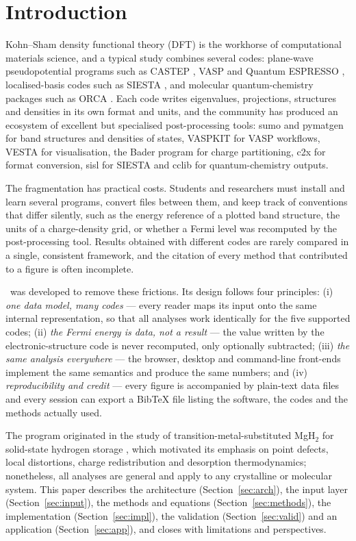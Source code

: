 \section{Introduction}
Kohn–Sham density functional theory (DFT) \cite{hohenberg1964,kohn1965} is the workhorse of computational materials science, and a typical study combines several codes: plane-wave pseudopotential programs such as CASTEP \cite{clark2005castep}, VASP \cite{kresse1996vasp} and Quantum ESPRESSO \cite{giannozzi2009,giannozzi2017}, localised-basis codes such as SIESTA \cite{soler2002siesta}, and molecular quantum-chemistry packages such as ORCA \cite{neese2020}. Each code writes eigenvalues, projections, structures and densities in its own format and units, and the community has produced an ecosystem of excellent but specialised post-processing tools: sumo \cite{ganose2018sumo} and pymatgen \cite{ong2013pymatgen} for band structures and densities of states, VASPKIT \cite{wang2021vaspkit} for VASP workflows, VESTA \cite{momma2011vesta} for visualisation, the Bader program \cite{henkelman2006,tang2009bader} for charge partitioning, c2x \cite{rutter2018c2x} for format conversion, sisl for SIESTA and cclib \cite{oboyle2008cclib} for quantum-chemistry outputs.

The fragmentation has practical costs. Students and researchers must install and learn several programs, convert files between them, and keep track of conventions that differ silently, such as the energy reference of a plotted band structure, the units of a charge-density grid, or whether a Fermi level was recomputed by the post-processing tool. Results obtained with different codes are rarely compared in a single, consistent framework, and the citation of every method that contributed to a figure is often incomplete.

\BMR\ was developed to remove these frictions. Its design follows four principles: (i) \emph{one data model, many codes} — every reader maps its input onto the same internal representation, so that all analyses work identically for the five supported codes; (ii) \emph{the Fermi energy is data, not a result} — the value written by the electronic-structure code is never recomputed, only optionally subtracted; (iii) \emph{the same analysis everywhere} — the browser, desktop and command-line front-ends implement the same semantics and produce the same numbers; and (iv) \emph{reproducibility and credit} — every figure is accompanied by plain-text data files and every session can export a BibTeX file listing the software, the codes and the methods actually used.

The program originated in the study of transition-metal-substituted MgH$_2$ for solid-state hydrogen storage \cite{sakintuna2007,macedo2025tcc}, which motivated its emphasis on point defects, local distortions, charge redistribution and desorption thermodynamics; nonetheless, all analyses are general and apply to any crystalline or molecular system. This paper describes the architecture (Section~\ref{sec:arch}), the input layer (Section~\ref{sec:input}), the methods and equations (Section~\ref{sec:methods}), the implementation (Section~\ref{sec:impl}), the validation (Section~\ref{sec:valid}) and an application (Section~\ref{sec:app}), and closes with limitations and perspectives.
